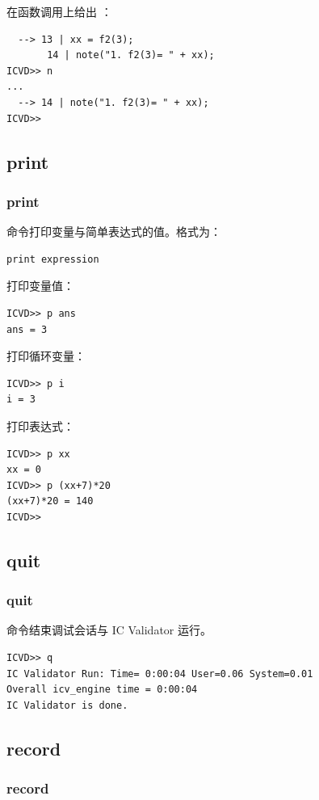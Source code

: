 在函数调用上给出 ：
\begin{lstlisting}
  --> 13 | xx = f2(3);
       14 | note("1. f2(3)= " + xx);
ICVD>> n
...
  --> 14 | note("1. f2(3)= " + xx);
ICVD>>
\end{lstlisting}

\subsection{print}
\subsubsection*{print}

 命令打印变量与简单表达式的值。格式为：

\begin{lstlisting}
print expression
\end{lstlisting}

打印变量值：
\begin{lstlisting}
ICVD>> p ans
ans = 3
\end{lstlisting}

打印循环变量：
\begin{lstlisting}
ICVD>> p i
i = 3
\end{lstlisting}

打印表达式：
\begin{lstlisting}
ICVD>> p xx
xx = 0
ICVD>> p (xx+7)*20
(xx+7)*20 = 140
ICVD>>
\end{lstlisting}

\subsection{quit}
\subsubsection*{quit}

 命令结束调试会话与 IC Validator 运行。

\begin{lstlisting}
ICVD>> q
IC Validator Run: Time= 0:00:04 User=0.06 System=0.01
Overall icv_engine time = 0:00:04
IC Validator is done.
\end{lstlisting}

\subsection{record}
\subsubsection*{record}

